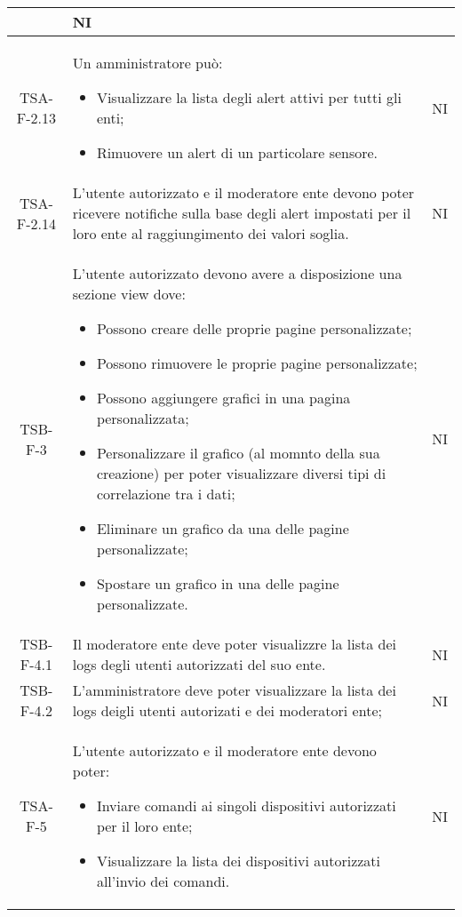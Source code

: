 \begin{center}
\begin{longtable}{|c|p{10cm}|c|}
\begin{itemize}
			 \end{itemize} & NI \\
			 \hline
			 TSA-F-2.13 & Un amministratore può:
			  \begin{itemize}
			  	\item Visualizzare la lista degli alert attivi per tutti gli enti;
			  	\item Rimuovere un alert di un particolare sensore.
			  \end{itemize} & NI \\
			  \hline
			  TSA-F-2.14 & L'utente autorizzato e il moderatore ente devono poter ricevere notifiche sulla base degli alert impostati per il loro ente al raggiungimento dei valori soglia. & NI \\
			  \hline
			  TSB-F-3 & L'utente autorizzato devono avere a disposizione una sezione view dove:
			  \begin{itemize}
			  	\item Possono creare delle proprie pagine personalizzate;
			  	\item Possono rimuovere le proprie pagine personalizzate;
			  	\item Possono aggiungere grafici in una pagina personalizzata;
			  	\item Personalizzare il grafico (al momnto della sua creazione) per poter visualizzare diversi tipi di correlazione tra i dati;
			  	\item Eliminare un grafico da una delle pagine personalizzate;
			  	\item Spostare un grafico in una delle pagine personalizzate. 
			  \end{itemize} & NI \\
			  \hline
			  TSB-F-4.1 & Il moderatore ente deve poter visualizzre la lista dei logs degli utenti autorizzati del suo ente. & NI \\
			  \hline
			  TSB-F-4.2 & L'amministratore deve poter visualizzare la lista dei logs deigli utenti autorizati e dei moderatori ente; & NI \\
			  \hline
			  TSA-F-5 & L'utente autorizzato e il moderatore ente devono poter:
			  \begin{itemize}
			  	\item Inviare comandi ai singoli dispositivi autorizzati per il loro ente;
			  	\item Visualizzare la lista dei dispositivi autorizzati all'invio dei comandi.
			  \end{itemize} & NI \\

\end{longtable}
\end{center}
